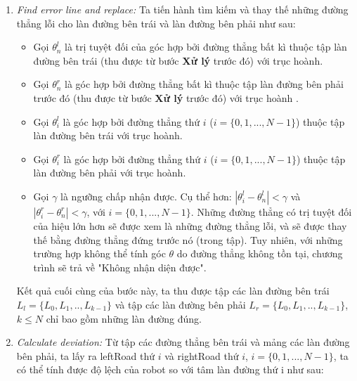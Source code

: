 \begin{enumerate}
    \item \textit{Find error line and replace:} Ta tiến hành tìm kiếm và thay thế những đường thẳng lỗi cho làn đường bên trái và làn đường bên phải như sau:

    
    \begin{itemize}
        \item Gọi $\theta_{n}^{l}$ là trị tuyệt đối của góc hợp bởi đường thẳng bất kì thuộc tập làn đường bên trái (thu được từ bước \textbf{Xử lý} trước đó) với trục hoành. 
        \item Gọi $\theta_{n}^{r}$ là góc hợp bởi đường thẳng bất kì thuộc tập làn đường bên phải trước đó (thu được từ bước \textbf{Xử lý} trước đó) với trục hoành .
        \item Gọi $\theta_{i}^{l}$ là góc hợp bởi đường thẳng thứ $i$ ($i = \{0,1,...,N-1\}$) thuộc tập làn đường bên trái với trục hoành.
        \item Gọi $\theta_{i}^{r}$ là góc hợp bởi đường thẳng thứ $i$ ($i = \{0,1,...,N-1\}$) thuộc tập làn đường bên phải với trục hoành.
        \item Gọi $\gamma$ là ngưỡng chấp nhận được. Cụ thể hơn: $|\theta_{i}^{l} - \theta_{n}^{l}| < \gamma$ và $|\theta_{i}^{r} - \theta_{n}^{r}| < \gamma$, với $i = \{0,1,...,N-1\}$. Những đường thẳng có trị tuyệt đối của hiệu lớn hơn sẽ được xem là những đường thẳng lỗi, và sẽ được thay thế bằng đường thẳng đứng trước nó (trong tập). Tuy nhiên, với những trường hợp không thể tính góc $\theta$ do đường thẳng không tồn tại, chương trình sẽ trả về "Không nhận diện được".
    \end{itemize}
    Kết quả cuối cùng của bước này, ta thu được tập các làn đường bên trái $L_{l} = \{ L_0, L_1,.., L_{k-1}\}$ và tập các làn đường bên phải $L_{r} = \{L_0, L_1,.., L_{k-1}\}$, $k \leq N$ chỉ bao gồm những làn đường đúng.
    \item \textit{Calculate deviation:} Từ tập các đường thẳng bên trái và mảng các làn đường bên phải, ta lấy ra leftRoad thứ $i$ và rightRoad thứ $i$, $i = \{0,1,...,N-1\}$, ta có thể tính được độ lệch của robot so với tâm làn đường thứ i như sau:

\end{enumerate}
